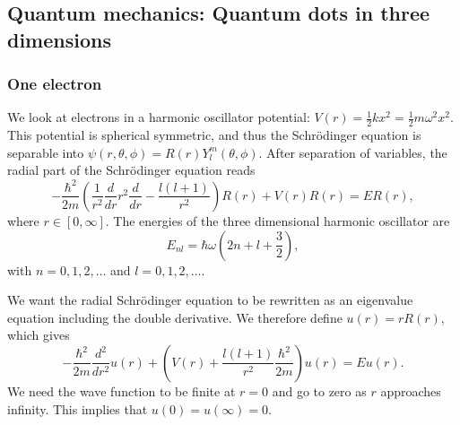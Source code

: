 \documentclass[%
 reprint,
nofootinbib,
aps,
]{revtex4-1}
\begin{document}
\subsection{Quantum mechanics: Quantum dots in three dimensions}

\subsubsection{One electron}

We look at electrons in a harmonic oscillator potential: $V(r) = \frac{1}{2}kx^2 = \frac{1}{2}m\omega^2x^2$. This potential is spherical symmetric, and thus the Schrödinger equation is separable into $\psi(r, \theta, \phi) = R(r)Y^m_l(\theta, \phi)$. After separation of variables, the radial part of the Schrödinger equation reads
\begin{equation}
  -\frac{\hbar^2}{2 m} \left ( \frac{1}{r^2} \frac{d}{dr} r^2
  \frac{d}{dr} - \frac{l (l + 1)}{r^2} \right )R(r)
     + V(r) R(r) = E R(r),
\end{equation}
where $r \in [0, \infty]$. The energies of the three dimensional harmonic oscillator are
\begin{equation}\label{eq: HO energy}
E_{nl}=  \hbar \omega \left(2n+l+\frac{3}{2}\right),
\end{equation}
with $n=0,1,2,\dots$ and $l=0,1,2,\dots$.

We want the radial Schrödinger equation to be rewritten as an eigenvalue equation including the double derivative. We therefore define $u(r) = rR(r)$, which gives
\begin{equation}
  -\frac{\hbar^2}{2 m} \frac{d^2}{dr^2} u(r)
       + \left ( V(r) + \frac{l (l + 1)}{r^2}\frac{\hbar^2}{2 m}
                                    \right ) u(r)  = E u(r) .
\end{equation}
We need the wave function to be finite at $r = 0$ and go to zero as $r$ approaches infinity. This implies that $u(0) = u(\infty) = 0$.
\end{document}
